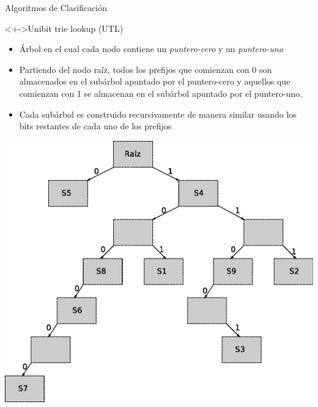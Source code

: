 \documentclass[xcolor=dvipsnames]{beamer}
\begin{document}
\begin{frame}{Algoritmos de Clasificación}
  \begin{block}<+->{Unibit trie lookup (UTL)}   
    \begin{itemize}
      \scriptsize
     	\item Árbol en el cual cada nodo contiene un \textit{puntero-cero }y un \textit{puntero-uno}
	\item Partiendo del nodo raíz, todos los prefijos que comienzan con 0 son almacenados en el subárbol apuntado por el puntero-cero y aquellos que comienzan con 1 se almacenan en el subárbol apuntado por el puntero-uno.
	\item Cada subárbol es construido recursivamente de manera similar usando los bits restantes de cada uno de los prefijos
    \end{itemize}
\centering 
\includegraphics[scale=0.25]{figures/trie.eps}	
  \end{block}
\end{frame}
\end{document}

